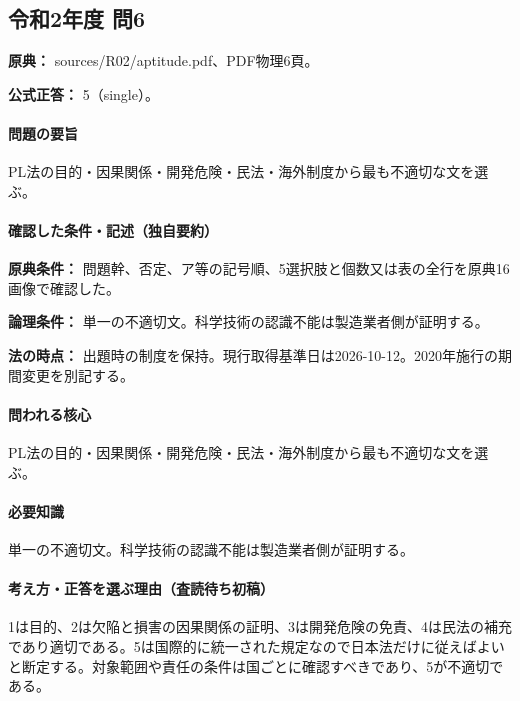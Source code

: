 \subsection{令和2年度 問6}
\label{q:r02-reg-apt-06}

\noindent\textbf{原典：} sources/R02/aptitude.pdf、PDF物理6頁。

\textbf{公式正答：} 5（single）。

\paragraph{問題の要旨} PL法の目的・因果関係・開発危険・民法・海外制度から最も不適切な文を選ぶ。

\paragraph{確認した条件・記述（独自要約）}\mbox{}\par

\noindent\textbf{原典条件：} 問題幹、否定、ア等の記号順、5選択肢と個数又は表の全行を原典16画像で確認した。\par

\noindent\textbf{論理条件：} 単一の不適切文。科学技術の認識不能は製造業者側が証明する。\par

\noindent\textbf{法の時点：} 出題時の制度を保持。現行取得基準日は2026-10-12。2020年施行の期間変更を別記する。\par

\paragraph{問われる核心} PL法の目的・因果関係・開発危険・民法・海外制度から最も不適切な文を選ぶ。

\paragraph{必要知識} 単一の不適切文。科学技術の認識不能は製造業者側が証明する。

\paragraph{考え方・正答を選ぶ理由（査読待ち初稿）} 1は目的、2は欠陥と損害の因果関係の証明、3は開発危険の免責、4は民法の補充であり適切である。5は国際的に統一された規定なので日本法だけに従えばよいと断定する。対象範囲や責任の条件は国ごとに確認すべきであり、5が不適切である。

